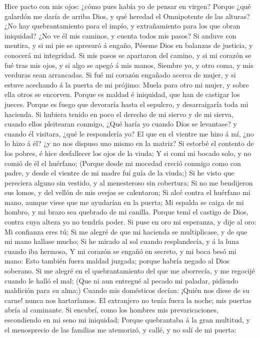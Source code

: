  Hice pacto con mis ojos: ¿cómo pues había yo de pensar en
virgen?  Porque ¿qué galardón me daría de arriba Dios, y qué
heredad el Omnipotente de las alturas?  ¿No hay
quebrantamiento para el impío, y extrañamiento para los que obran
iniquidad?  ¿No ve él mis caminos, y cuenta todos mis pasos?
 Si anduve con mentira, y si mi pie se apresuró á engaño,
 Péseme Dios en balanzas de justicia, y conocerá mi
integridad.  Si mis pasos se apartaron del camino, y si mi
corazón se fué tras mis ojos, y si algo se apegó á mis manos,
 Siembre yo, y otro coma, y mis verduras sean arrancadas.
 Si fué mi corazón engañado acerca de mujer, y si estuve
acechando á la puerta de mi prójimo:  Muela para otro mi
mujer, y sobre ella otros se encorven.  Porque es maldad é
iniquidad, que han de castigar los jueces.  Porque es fuego
que devoraría hasta el sepulcro, y desarraigaría toda mi hacienda.
 Si hubiera tenido en poco el derecho de mi siervo y de mi
sierva, cuando ellos pleitearan conmigo,  ¿Qué haría yo
cuando Dios se levantase? y cuando él visitara, ¿qué le respondería yo?
 El que en el vientre me hizo á mí, ¿no lo hizo á él? ¿y no
nos dispuso uno mismo en la matriz?  Si estorbé el contento
de los pobres, é hice desfallecer los ojos de la viuda;  Y
si comí mi bocado solo, y no comió de él el huérfano; 
(Porque desde mi mocedad creció conmigo como con padre, y desde el
vientre de mi madre fuí guía de la viuda;)  Si he visto que
pereciera alguno sin vestido, y al menesteroso sin cobertura;
 Si no me bendijeron sus lomos, y del vellón de mis ovejas
se calentaron;  Si alcé contra el huérfano mi mano, aunque
viese que me ayudarían en la puerta;  Mi espalda se caiga
de mi hombro, y mi brazo sea quebrado de mi canilla. 
Porque temí el castigo de Dios, contra cuya alteza yo no tendría poder.
 Si puse en oro mi esperanza, y dije al oro: Mi confianza
eres tú;  Si me alegré de que mi hacienda se multiplicase,
y de que mi mano hallase mucho;  Si he mirado al sol cuando
resplandecía, y á la luna cuando iba hermosa,  Y mi corazón
se engañó en secreto, y mi boca besó mi mano:  Esto también
fuera maldad juzgada; porque habría negado al Dios soberano.
 Si me alegré en el quebrantamiento del que me aborrecía, y
me regocijé cuando le halló el mal;  (Que ni aun entregué
al pecado mi paladar, pidiendo maldición para su alma;) 
Cuando mis domésticos decían: ¡Quién nos diese de su carne! nunca nos
hartaríamos.  El extranjero no tenía fuera la noche; mis
puertas abría al caminante.  Si encubrí, como los hombres
mis prevaricaciones, escondiendo en mi seno mi iniquidad; 
Porque quebrantaba á la gran multitud, y el menosprecio de las familias
me atemorizó, y callé, y no salí de mi puerta:

